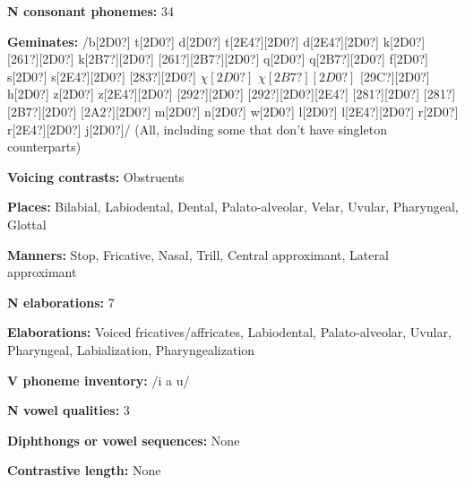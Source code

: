 \begin{styleBody}
\textbf{N consonant phonemes: }34
\end{styleBody}

\begin{styleBody}
\textbf{Geminates:} /b[2D0?] t[2D0?] d[2D0?] t[2E4?][2D0?] d[2E4?][2D0?] k[2D0?] [261?][2D0?] k[2B7?][2D0?] [261?][2B7?][2D0?] q[2D0?] q[2B7?][2D0?] f[2D0?] s[2D0?] s[2E4?][2D0?] [283?][2D0?] $\chi [2D0?]$ $\chi [2B7?][2D0?]$ [29C?][2D0?] h[2D0?] z[2D0?] z[2E4?][2D0?] [292?][2D0?] [292?][2D0?][2E4?] [281?][2D0?] [281?][2B7?][2D0?] [2A2?][2D0?] m[2D0?] n[2D0?] w[2D0?] l[2D0?] l[2E4?][2D0?] r[2D0?] r[2E4?][2D0?] j[2D0?]/ (All, including some that don’t have singleton counterparts)
\end{styleBody}

\begin{styleBody}
\textbf{Voicing contrasts:} Obstruents
\end{styleBody}

\begin{styleBody}
\textbf{Places:} Bilabial, Labiodental, Dental, Palato-alveolar, Velar, Uvular, Pharyngeal, Glottal
\end{styleBody}

\begin{styleBody}
\textbf{Manners:} Stop, Fricative, Nasal, Trill, Central approximant, Lateral approximant
\end{styleBody}

\begin{styleBody}
\textbf{N elaborations:} 7
\end{styleBody}

\begin{styleBody}
\textbf{Elaborations:} Voiced fricatives/affricates, Labiodental, Palato-alveolar, Uvular, Pharyngeal, Labialization, Pharyngealization
\end{styleBody}

\begin{styleBody}
\textbf{V phoneme inventory:} /i a u/
\end{styleBody}

\begin{styleBody}
\textbf{N vowel qualities:} 3
\end{styleBody}

\begin{styleBody}
\textbf{Diphthongs or vowel sequences:} None
\end{styleBody}

\begin{styleBody}
\textbf{Contrastive length:} None
\end{styleBody}

